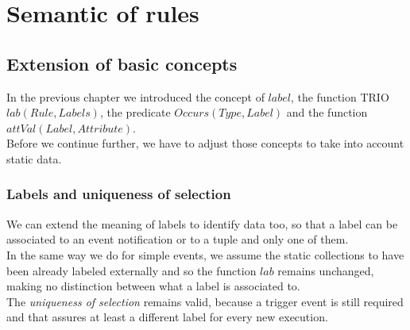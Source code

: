 \newpage

\section{Semantic of rules}

\subsection{Extension of basic concepts}
In the previous chapter we introduced the concept of $label$, the function TRIO $lab(Rule, Labels)$, the predicate $Occurs(Type, Label)$ and the function $attVal(Label, Attribute)$.\\
Before we continue further, we have to adjust those concepts to take into account static data.

\subsubsection{Labels and uniqueness of selection}
We can extend the meaning of labels to identify data too, so that a label can be associated to an event notification or to a tuple and only one of them.\\
In the same way we do for simple events, we assume the static collections to have been already labeled externally and so the function $lab$ remains unchanged, making no distinction between what a label is associated to.\\
The \emph{uniqueness of selection} remains valid, because a trigger event is still required and that assures at least a different label for every new execution.

